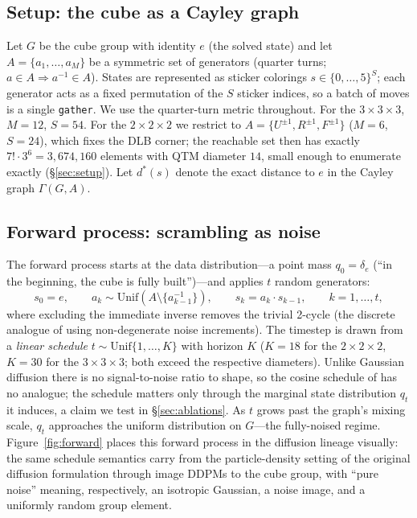 \documentclass[11pt]{article}
\newcommand{\dstar}{d^{*}}
\begin{document}
\subsection{Setup: the cube as a Cayley graph}

Let $G$ be the cube group with identity $e$ (the solved state) and let
$A=\{a_1,\dots,a_M\}$ be a symmetric set of generators (quarter turns;
$a\in A \Rightarrow a^{-1}\in A$). States are represented as sticker
colorings $s\in\{0,\dots,5\}^{S}$; each generator acts as a fixed permutation
of the $S$ sticker indices, so a batch of moves is a single \texttt{gather}.
We use the quarter-turn metric throughout. For the $3{\times}3{\times}3$,
$M{=}12$, $S{=}54$. For the $2{\times}2{\times}2$ we restrict to
$A=\{U^{\pm1},R^{\pm1},F^{\pm1}\}$ ($M{=}6$, $S{=}24$), which fixes the DLB
corner; the reachable set then has exactly $7!\cdot3^6 = 3{,}674{,}160$
elements with QTM diameter $14$, small enough to enumerate exactly
(\S\ref{sec:setup}). Let $\dstar(s)$ denote the exact distance to $e$ in the
Cayley graph $\Gamma(G,A)$.

\subsection{Forward process: scrambling as noise}

The forward process starts at the data distribution---a point mass
$q_0=\delta_e$ (``in the beginning, the cube is fully built'')---and applies
$t$ random generators:
\begin{equation}
s_0 = e,\qquad
a_k \sim \mathrm{Unif}\!\left(A\setminus\{a_{k-1}^{-1}\}\right),\qquad
s_k = a_k \cdot s_{k-1},\qquad k=1,\dots,t ,
\label{eq:forward}
\end{equation}
where excluding the immediate inverse removes the trivial 2-cycle (the
discrete analogue of using non-degenerate noise increments). The timestep is
drawn from a \emph{linear schedule} $t\sim\mathrm{Unif}\{1,\dots,K\}$ with
horizon $K$ ($K{=}18$ for the $2{\times}2{\times}2$, $K{=}30$ for the
$3{\times}3{\times}3$; both exceed the respective diameters). Unlike Gaussian
diffusion there is no signal-to-noise ratio to shape, so the cosine schedule
of \citet{nichol2021} has no analogue; the schedule matters only through the
marginal state distribution $q_t$ it induces, a claim we test in
\S\ref{sec:ablations}. As $t$ grows past the graph's mixing scale, $q_t$
approaches the uniform distribution on $G$---the fully-noised regime.
Figure~\ref{fig:forward} places this forward process in the diffusion lineage
visually: the same schedule semantics carry from the particle-density setting
of the original diffusion formulation through image DDPMs to the cube group,
with ``pure noise'' meaning, respectively, an isotropic Gaussian, a noise
image, and a uniformly random group element.
\end{document}
